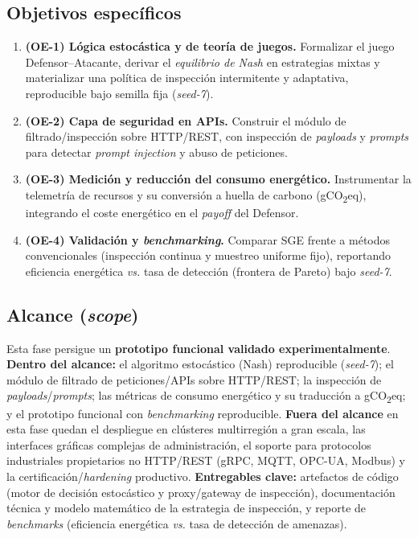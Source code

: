 \documentclass[10pt,twocolumn]{article}
\begin{document}
\subsection{Objetivos espec\'ificos}
\begin{enumerate}\itemsep2pt
  \item \textbf{(OE-1) L\'ogica estoc\'astica y de teor\'ia de juegos.} Formalizar el
        juego Defensor--Atacante, derivar el \emph{equilibrio de Nash} en estrategias
        mixtas y materializar una pol\'itica de inspecci\'on intermitente y
        adaptativa, reproducible bajo semilla fija (\emph{seed-7}).
  \item \textbf{(OE-2) Capa de seguridad en APIs.} Construir el m\'odulo de
        filtrado/inspecci\'on sobre HTTP/REST, con inspecci\'on de \emph{payloads} y
        \emph{prompts} para detectar \emph{prompt injection} y abuso de peticiones.
  \item \textbf{(OE-3) Medici\'on y reducci\'on del consumo energ\'etico.}
        Instrumentar la telemetr\'ia de recursos y su conversi\'on a huella de carbono
        (gCO\textsubscript{2}eq), integrando el coste energ\'etico en el \emph{payoff}
        del Defensor.
  \item \textbf{(OE-4) Validaci\'on y \emph{benchmarking}.} Comparar SGE frente a
        m\'etodos convencionales (inspecci\'on continua y muestreo uniforme fijo),
        reportando eficiencia energ\'etica \emph{vs.} tasa de detecci\'on (frontera de
        Pareto) bajo \emph{seed-7}.
\end{enumerate}

\subsection{Alcance (\emph{scope})}
Esta fase persigue un \textbf{prototipo funcional validado experimentalmente}.
\textbf{Dentro del alcance:} el algoritmo estoc\'astico (Nash) reproducible
(\emph{seed-7}); el m\'odulo de filtrado de peticiones/APIs sobre HTTP/REST; la
inspecci\'on de \emph{payloads}/\emph{prompts}; las m\'etricas de consumo energ\'etico
y su traducci\'on a gCO\textsubscript{2}eq; y el prototipo funcional con
\emph{benchmarking} reproducible. \textbf{Fuera del alcance} en esta fase quedan el
despliegue en cl\'usteres multirregi\'on a gran escala, las interfaces gr\'aficas
complejas de administraci\'on, el soporte para protocolos industriales propietarios no
HTTP/REST (gRPC, MQTT, OPC-UA, Modbus) y la certificaci\'on/\emph{hardening}
productivo. \textbf{Entregables clave:} artefactos de c\'odigo (motor de decisi\'on
estoc\'astico y proxy/gateway de inspecci\'on), documentaci\'on t\'ecnica y modelo
matem\'atico de la estrategia de inspecci\'on, y reporte de \emph{benchmarks}
(eficiencia energ\'etica \emph{vs.} tasa de detecci\'on de amenazas).
\end{document}

